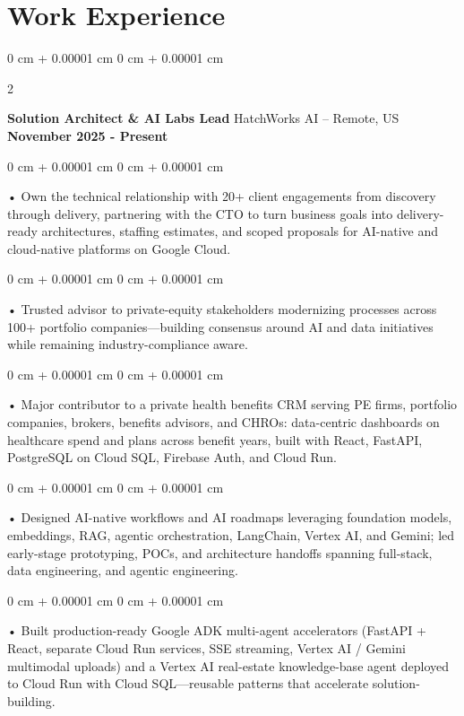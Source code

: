 \documentclass[10pt, letterpaper]{article}
\newenvironment{onecolentry}{
    \begin{adjustwidth}{
        0 cm + 0.00001 cm
    }{
        0 cm + 0.00001 cm
    }
}{
    \end{adjustwidth}
} %
\newenvironment{twocolentry}[2][]{
    \onecolentry
    \def\secondColumn{#2}
    \setcolumnwidth{\fill, 4.5 cm}
    \begin{paracol}{2}
}{
    \switchcolumn \raggedleft \secondColumn
    \end{paracol}
    \endonecolentry
} %
\begin{document}
    \vspace{0.5cm}
    \section{Work Experience}
        \vspace{0.1cm}

        \begin{twocolentry}{
            \textbf{November 2025 - Present}
        }
            \textbf{Solution Architect \& AI Labs Lead} HatchWorks AI -- Remote, US\end{twocolentry}

        \begin{onecolentry}
             • Own the technical relationship with 20+ client engagements from discovery through delivery, partnering with the CTO to turn business goals into delivery-ready architectures, staffing estimates, and scoped proposals for AI-native and cloud-native platforms on Google Cloud.
        \end{onecolentry}
        \begin{onecolentry}
             • Trusted advisor to private-equity stakeholders modernizing processes across 100+ portfolio companies---building consensus around AI and data initiatives while remaining industry-compliance aware.
        \end{onecolentry}
        \begin{onecolentry}
             • Major contributor to a private health benefits CRM serving PE firms, portfolio companies, brokers, benefits advisors, and CHROs: data-centric dashboards on healthcare spend and plans across benefit years, built with React, FastAPI, PostgreSQL on Cloud SQL, Firebase Auth, and Cloud Run.
        \end{onecolentry}
        \begin{onecolentry}
             • Designed AI-native workflows and AI roadmaps leveraging foundation models, embeddings, RAG, agentic orchestration, LangChain, Vertex AI, and Gemini; led early-stage prototyping, POCs, and architecture handoffs spanning full-stack, data engineering, and agentic engineering.
        \end{onecolentry}
        \begin{onecolentry}
             • Built production-ready Google ADK multi-agent accelerators (FastAPI + React, separate Cloud Run services, SSE streaming, Vertex AI / Gemini multimodal uploads) and a Vertex AI real-estate knowledge-base agent deployed to Cloud Run with Cloud SQL---reusable patterns that accelerate solution-building.
        \end{onecolentry}
\end{document}
